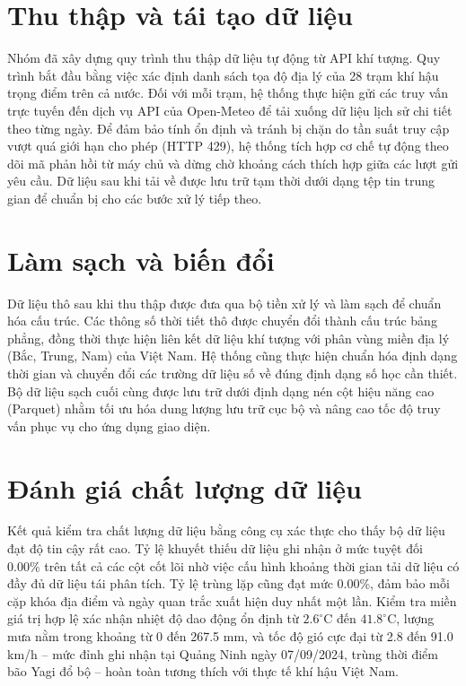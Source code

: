 \section{Thu thập và tái tạo dữ liệu}
Nhóm đã xây dựng quy trình thu thập dữ liệu tự động từ API khí tượng. Quy trình bắt đầu bằng việc xác định danh sách tọa độ địa lý của 28 trạm khí hậu trọng điểm trên cả nước. Đối với mỗi trạm, hệ thống thực hiện gửi các truy vấn trực tuyến đến dịch vụ API của Open-Meteo để tải xuống dữ liệu lịch sử chi tiết theo từng ngày. Để đảm bảo tính ổn định và tránh bị chặn do tần suất truy cập vượt quá giới hạn cho phép (HTTP 429), hệ thống tích hợp cơ chế tự động theo dõi mã phản hồi từ máy chủ và dừng chờ khoảng cách thích hợp giữa các lượt gửi yêu cầu. Dữ liệu sau khi tải về được lưu trữ tạm thời dưới dạng tệp tin trung gian để chuẩn bị cho các bước xử lý tiếp theo.

\section{Làm sạch và biến đổi}
Dữ liệu thô sau khi thu thập được đưa qua bộ tiền xử lý và làm sạch để chuẩn hóa cấu trúc. Các thông số thời tiết thô được chuyển đổi thành cấu trúc bảng phẳng, đồng thời thực hiện liên kết dữ liệu khí tượng với phân vùng miền địa lý (Bắc, Trung, Nam) của Việt Nam. Hệ thống cũng thực hiện chuẩn hóa định dạng thời gian và chuyển đổi các trường dữ liệu số về đúng định dạng số học cần thiết. Bộ dữ liệu sạch cuối cùng được lưu trữ dưới định dạng nén cột hiệu năng cao (Parquet) nhằm tối ưu hóa dung lượng lưu trữ cục bộ và nâng cao tốc độ truy vấn phục vụ cho ứng dụng giao diện.

\section{Đánh giá chất lượng dữ liệu}
Kết quả kiểm tra chất lượng dữ liệu bằng công cụ xác thực cho thấy bộ dữ liệu đạt độ tin cậy rất cao. Tỷ lệ khuyết thiếu dữ liệu ghi nhận ở mức tuyệt đối 0.00\% trên tất cả các cột cốt lõi nhờ việc cấu hình khoảng thời gian tải dữ liệu có đầy đủ dữ liệu tái phân tích. Tỷ lệ trùng lặp cũng đạt mức 0.00\%, đảm bảo mỗi cặp khóa địa điểm và ngày quan trắc xuất hiện duy nhất một lần. Kiểm tra miền giá trị hợp lệ xác nhận nhiệt độ dao động ổn định từ $2.6^\circ$C đến $41.8^\circ$C, lượng mưa nằm trong khoảng từ 0 đến 267.5 mm, và tốc độ gió cực đại từ 2.8 đến 91.0 km/h -- mức đỉnh ghi nhận tại Quảng Ninh ngày 07/09/2024, trùng thời điểm bão Yagi đổ bộ -- hoàn toàn tương thích với thực tế khí hậu Việt Nam.

